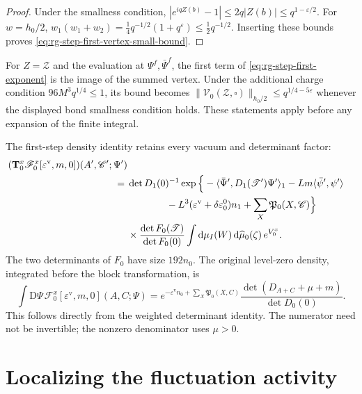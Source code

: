 \begin{proof}
Under the smallness condition,
$|e^{iqZ(b)}-1|\le2q|Z(b)|\le q^{1-\varepsilon/2}$.
For $w=h_0/2$,
$w_1(w_1+w_2)=\frac14q^{-1/2}(1+q^\varepsilon)
\le\frac12q^{-1/2}$. Inserting these bounds proves
\eqref{eq:rg-step-first-vertex-small-bound}.
\end{proof}

For $Z=\mathscr Z$ and the evaluation at
$\Psi^f,\bar\Psi^f$, the first term of
\eqref{eq:rg-step-first-exponent} is the image of
the summed vertex. Under the additional charge
condition $96M^3q^{1/4}\le1$, its bound becomes
$\|\mathcal V_0(\mathscr Z,\square)\|_{h_0/2}
\le q^{1/4-5\varepsilon}$ whenever the displayed
bond smallness condition holds. These statements
apply before any expansion of the finite integral.

The first-step density identity retains every
vacuum and determinant factor:
\begin{equation}\label{eq:rg-step-first-density}
 \begin{split}
 (\mathbf T_0^x\mathscr F_0^x[\varepsilon^{\mathrm v},m,0])
                                    (A',\mathscr C';\Psi')\\
  ={}&\det D_1(0)^{-1}
       \exp\Big\{-\langle\bar\Psi',D_1(\mathscr T')\Psi'\rangle_1
                   -Lm\langle\bar\psi',\psi'\rangle\\
      &\hspace{14mm}
                   -L^3(\varepsilon^{\mathrm v}
                        +\delta\varepsilon_0^0)n_1
                   +\sum_X\mathfrak P_0(X,\mathscr C)\Big\}\\
       &\times
              \frac{\det F_0(\mathscr T)}{\det F_0(0)}
        \int\dd\mu_I(W)\,\dd\widehat\mu_0(\zeta)\,e^{V_0^x}.
 \end{split}
\end{equation}
The two determinants of $F_0$ have size $192n_0$.
The original level-zero density, integrated before
the block transformation, is
\begin{equation}\label{eq:rg-step-initial-integrated-density}
 \int\mathrm D\Psi\,\mathscr F_0^x
                     [\varepsilon^{\mathrm v},m,0](A,C;\Psi)
     =e^{-\varepsilon^{\mathrm v}n_0+\sum_X\mathfrak P_0(X,C)}
               \frac{\det(D_{A+C}+\mu+m)}{\det D_0(0)}.
\end{equation}
This follows directly from the weighted determinant
identity. The numerator need not be invertible;
the nonzero denominator uses $\mu>0$.


\section{Localizing the fluctuation activity}\label{sec:rg-nonlinear-step}

